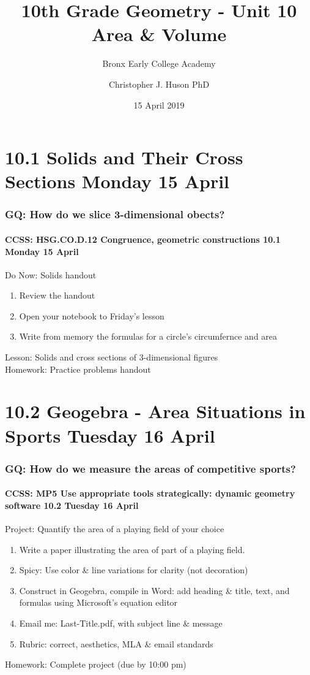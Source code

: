 \documentclass{beamer}
\title{10th Grade Geometry - Unit 10 Area \& Volume}
\subtitle{Bronx Early College Academy}
\author{Christopher J. Huson PhD}
\date{15 April 2019}
\begin{document}
\frame{\titlepage}
\section[Outline]{}
\frame{\tableofcontents}


\section{10.1 Solids and Their Cross Sections Monday 15 April}
  \frame
  {
    \frametitle{GQ: How do we slice 3-dimensional obects?}
    \framesubtitle{CCSS: HSG.CO.D.12 Congruence, geometric constructions \hfill \alert{10.1 Monday 15 April}}

    \begin{block}{Do Now: Solids handout}
      \begin{enumerate}
        \item Review the handout
        \item Open your notebook to Friday's lesson
        \item Write from memory the formulas for a circle's circumfernce and area
      \end{enumerate}
    \end{block}
    Lesson: Solids and cross sections of 3-dimensional figures\\
    Homework: Practice problems handout
  }

\section{10.2 Geogebra - Area Situations in Sports Tuesday 16 April}
  \frame
  {
    \frametitle{GQ: How do we measure the areas of competitive sports?}
    \framesubtitle{CCSS: MP5 Use appropriate tools strategically: dynamic geometry software \hfill \alert{10.2 Tuesday 16 April}}

    \begin{block}{Project: Quantify the area of a playing field of your choice}
      \begin{enumerate}
        \item Write a paper illustrating the area of part of a playing field.
        \item Spicy: Use color \& line variations for clarity (not decoration)
        \item Construct in Geogebra, compile in Word: add heading \& title, text, and formulas using Microsoft's equation editor
        \item Email me: Last-Title.pdf, with subject line \& message
        \item Rubric: correct, aesthetics, MLA \& email standards
      \end{enumerate}
    \end{block}
    Homework: Complete project (due by 10:00 pm)
  }
\end{document}
